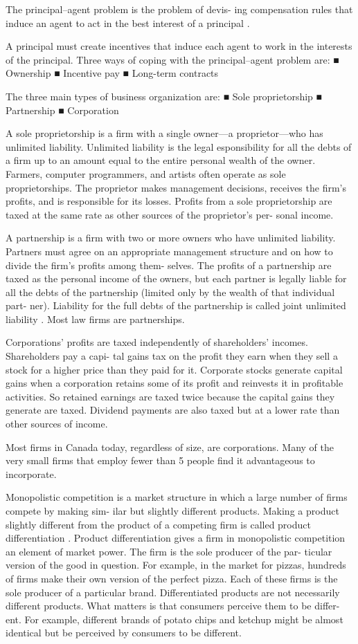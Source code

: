 \documentclass[12pt,a4paper,article]{memoir} %
\begin{document}
The principal–agent problem is the problem of devis-
ing compensation rules that induce an agent to act
in the best interest of a principal .

A principal must create incentives that induce each
agent to work in the interests of the principal. Three
ways of coping with the principal–agent problem are:
■ Ownership
■ Incentive pay
■ Long-term contracts

The three main types of business organization are:
■ Sole proprietorship
■ Partnership
■ Corporation

A sole proprietorship is a firm
with a single owner—a proprietor—who has
unlimited liability. Unlimited liability is the legal
esponsibility for all the debts of a firm up to an
amount equal to the entire personal wealth of the
owner. Farmers, computer programmers, and artists
often operate as sole proprietorships.
The proprietor makes management decisions,
receives the firm’s profits, and is responsible for its
losses. Profits from a sole proprietorship are taxed at
the same rate as other sources of the proprietor’s per-
sonal income.

A partnership is a firm with two or more
owners who have unlimited liability. Partners must
agree on an appropriate management structure and
on how to divide the firm’s profits among them-
selves. The profits of a partnership are taxed as the
personal income of the owners, but each partner
is legally liable for all the debts of the partnership
(limited only by the wealth of that individual part-
ner). Liability for the full debts of the partnership
is called joint unlimited liability . Most law firms are
partnerships.

Corporations’ profits are taxed independently
of shareholders’ incomes. Shareholders pay a capi-
tal gains tax on the profit they earn when they sell
a stock for a higher price than they paid for it.
Corporate stocks generate capital gains when a
corporation retains some of its profit and reinvests
it in profitable activities. So retained earnings are
taxed twice because the capital gains they generate
are taxed. Dividend payments are also taxed but at a
lower rate than other sources of income.

Most firms in Canada today, regardless of size, are
corporations. Many of the very small firms that employ
fewer than 5 people find it advantageous to incorporate.

Monopolistic competition is a market structure in
which a large number of firms compete by making sim-
ilar but slightly different products. Making a product
slightly different from the product of a competing firm
is called product differentiation . Product differentiation
gives a firm in monopolistic competition an element of
market power. The firm is the sole producer of the par-
ticular version of the good in question. For example,
in the market for pizzas, hundreds of firms make their
own version of the perfect pizza. Each of these firms is
the sole producer of a particular brand. Differentiated
products are not necessarily different products. What
matters is that consumers perceive them to be differ-
ent. For example, different brands of potato chips and
ketchup might be almost identical but be perceived by
consumers to be different.
\end{document}

